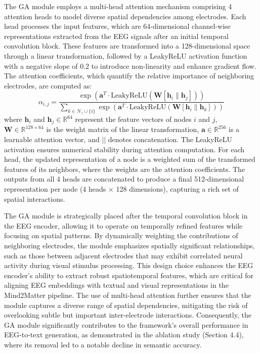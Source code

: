 \documentclass[sigconf]{acmart}
\begin{document}
The GA module employs a multi-head attention mechanism comprising 4 attention heads to model diverse spatial dependencies among electrodes. Each head processes the input features, which are 64-dimensional channel-wise representations extracted from the EEG signals after an initial temporal convolution block. These features are transformed into a 128-dimensional space through a linear transformation, followed by a LeakyReLU activation function with a negative slope of 0.2 to introduce non-linearity and enhance gradient flow. The attention coefficients, which quantify the relative importance of neighboring electrodes, are computed as:
\begin{equation}
\alpha_{i,j} = \frac{\exp(\mathbf{a}^T \cdot \text{LeakyReLU}(\mathbf{W}[\mathbf{h}_i \| \mathbf{h}_j]))}{\sum_{k \in \mathcal{N}_i \cup \{i\}} \exp(\mathbf{a}^T \cdot \text{LeakyReLU}(\mathbf{W}[\mathbf{h}_i \| \mathbf{h}_k]))}
\end{equation}
where $\mathbf{h}_i$ and $\mathbf{h}_j \in \mathbb{R}^{64}$ represent the feature vectors of nodes $i$ and $j$, $\mathbf{W} \in \mathbb{R}^{128 \times 64}$ is the weight matrix of the linear transformation, $\mathbf{a} \in \mathbb{R}^{256}$ is a learnable attention vector, and $||$ denotes concatenation. The LeakyReLU activation ensures numerical stability during attention computation. For each head, the updated representation of a node is a weighted sum of the transformed features of its neighbors, where the weights are the attention coefficients. The outputs from all 4 heads are concatenated to produce a final 512-dimensional representation per node (4 heads $\times$ 128 dimensions), capturing a rich set of spatial interactions.

The GA module is strategically placed after the temporal convolution block in the EEG encoder, allowing it to operate on temporally refined features while focusing on spatial patterns. By dynamically weighting the contributions of neighboring electrodes, the module emphasizes spatially significant relationships, such as those between adjacent electrodes that may exhibit correlated neural activity during visual stimulus processing. This design choice enhances the EEG encoder’s ability to extract robust spatiotemporal features, which are critical for aligning EEG embeddings with textual and visual representations in the Mind2Matter pipeline. The use of multi-head attention further ensures that the module captures a diverse range of spatial dependencies, mitigating the risk of overlooking subtle but important inter-electrode interactions. Consequently, the GA module significantly contributes to the framework’s overall performance in EEG-to-text generation, as demonstrated in the ablation study (Section 4.4), where its removal led to a notable decline in semantic accuracy.
\end{document}
